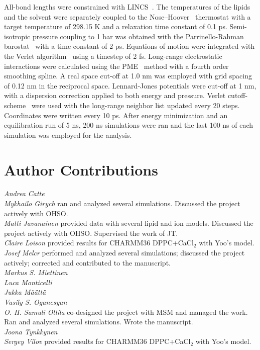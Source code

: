 \documentclass[twoside,twocolumn,9pt]{article}
\begin{document}
All-bond lengths were constrained with LINCS~\cite{hess97,hess07}. The temperatures of the lipids and the solvent were separately coupled to the Nose--Hoover~\cite{nose84,hoover85} 
thermostat with a target temperature of 298.15 K and a relaxation time constant of 0.1 ps. Semi-isotropic pressure coupling to 1 bar was obtained 
with the Parrinello-Rahman barostat~\cite{parrinello81} with a time constant of 2 ps. Equations of motion were integrated with the Verlet algorithm~\cite{pall13} using a 
timestep of 2 fs. Long-range electrostatic interactions were calculated using the PME~\cite{darden93,essman95} method with a fourth order smoothing spline. 
A real space cut-off at 1.0 nm was employed with grid spacing of 0.12 nm in the reciprocal space. Lennard-Jones potentials were cut-off at 1 nm, 
with a dispersion correction applied to both energy and pressure. Verlet cutoff-scheme~\cite{pall13} were used with the long-range neighbor list updated 
every 20 steps. Coordinates were written every 10 ps. After energy minimization and an equilibration run of 5 ns, 200 ns simulations were ran and 
the last 100 ns of each simulation was employed for the analysis.



\section{Author Contributions}
\noindent 
{\it Andrea Catte} \\
{\it Mykhailo Girych} ran and analyzed several simulations. Discussed the project actively with OHSO. \\
{\it Matti Javanainen} provided data with several lipid and ion models. Discussed the project actively with OHSO. Supervised the work of JT.\\
{\it Claire Loison} provided results for CHARMM36 DPPC+CaCl$_{2}$ with Yoo's model. \\
{\it Josef Melcr} performed and analyzed several simulations; discussed the project actively; corrected and contributed to the manuscript. \\
{\it Markus S. Miettinen} \\
{\it Luca Monticelli}  \\
{\it Jukka M{\"a}{\"a}tt{\"a}}  \\
{\it Vasily S. Oganesyan} \\
{\it O. H. Samuli Ollila} co-designed the project with MSM and managed the work. Ran and analyzed several simulations. Wrote the manuscript. \\
{\it Joona Tynkkynen } \\
{\it Sergey Vilov} provided results for CHARMM36 DPPC+CaCl$_{2}$ with Yoo's model. \\

\listoftodos

\end{document}
